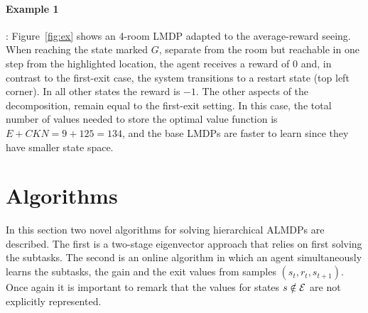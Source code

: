   \paragraph{Example 1}:
  Figure~\ref{fig:ex} shows an 4-room LMDP adapted to the average-reward seeing. When reaching the state marked $G$, separate from the room but reachable in one step from the highlighted location, the agent receives a reward of $0$ and, in contrast to the first-exit case, the system transitions to a restart state (top left corner). In all other states the reward is $-1$. The other aspects of the decomposition, remain equal to the first-exit setting. %
    In this case, the total number of values needed to store the optimal value function is $E+CKN=9+125=134$, and the base LMDPs are faster to learn since they have smaller state space.


\section{Algorithms}
In this section two novel algorithms for solving hierarchical ALMDPs are described. The first is a two-stage eigenvector approach that relies on first solving the subtasks. The second is an online algorithm in which an agent simultaneously learns the subtasks, the gain and the exit values from samples $(s_t, r_t, s_{t+1})$.
Once again it is important to remark that the values for states $s\notin\mathcal{E}$ are not explicitly represented.

